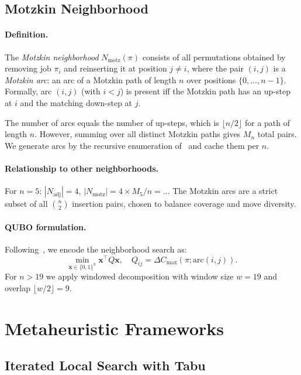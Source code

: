 \documentclass[runningheads]{llncs}
\begin{document}
\subsection{Motzkin Neighborhood}

\paragraph{Definition.}
The \emph{Motzkin neighborhood} $N_{\mathrm{motz}}(\pi)$ consists of all permutations obtained by removing job $\pi_i$ and reinserting it at position $j \neq i$, where the pair $(i,j)$ is a \emph{Motzkin arc}: an arc of a Motzkin path of length $n$ over positions $\{0,\ldots,n-1\}$. Formally, arc $(i,j)$ (with $i < j$) is present iff the Motzkin path has an up-step at $i$ and the matching down-step at $j$.

The number of arcs equals the number of up-steps, which is $\lfloor n/2 \rfloor$ for a path of length $n$. However, summing over all distinct Motzkin paths gives $M_n$ total pairs. We generate arcs by the recursive enumeration of~\cite{motzkin_enum} and cache them per $n$.

\paragraph{Relationship to other neighborhoods.}
For $n = 5$: $|N_{\mathrm{adj}}| = 4$, $|N_{\mathrm{motz}}| = 4 \times M_5 / n = \ldots$ The Motzkin arcs are a strict subset of all $\binom{n}{2}$ insertion pairs, chosen to balance coverage and move diversity.

\paragraph{QUBO formulation.}
Following~\cite{bozejko_qubo}, we encode the neighborhood search as:
\[
\min_{\mathbf{x} \in \{0,1\}^n} \mathbf{x}^\top Q \mathbf{x},\quad Q_{ij} = \Delta C_{\max}(\pi; \text{arc}(i,j)).
\]
For $n > 19$ we apply windowed decomposition with window size $w = 19$ and overlap $\lfloor w/2 \rfloor = 9$.

\section{Metaheuristic Frameworks}

\subsection{Iterated Local Search with Tabu}
\end{document}
